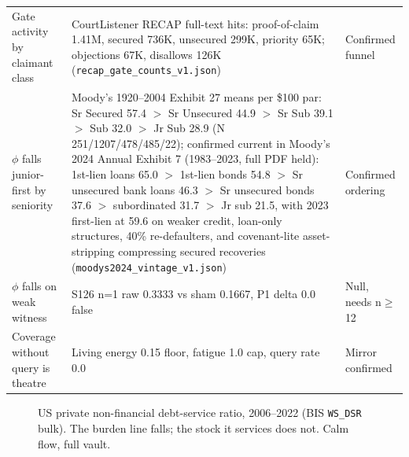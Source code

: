 \documentclass[11pt]{article}
\begin{document}
\begin{center}
\begin{tabular}{p{2.6cm}p{4.2cm}p{4.6cm}}
Gate activity by claimant class & CourtListener RECAP full-text hits: proof-of-claim 1.41M, secured 736K, unsecured 299K, priority 65K; objections 67K, disallows 126K (\texttt{recap\_gate\_counts\_v1.json}) & Confirmed funnel \\
$\phi$ falls junior-first by seniority & Moody's 1920--2004 Exhibit 27 means per \$100 par: Sr Secured 57.4 $>$ Sr Unsecured 44.9 $>$ Sr Sub 39.1 $>$ Sub 32.0 $>$ Jr Sub 28.9 (N 251/1207/478/485/22); confirmed current in Moody's 2024 Annual Exhibit 7 (1983--2023, full PDF held): 1st-lien loans 65.0 $>$ 1st-lien bonds 54.8 $>$ Sr unsecured bank loans 46.3 $>$ Sr unsecured bonds 37.6 $>$ subordinated 31.7 $>$ Jr sub 21.5, with 2023 first-lien at 59.6 on weaker credit, loan-only structures, 40\% re-defaulters, and covenant-lite asset-stripping compressing secured recoveries (\texttt{moodys2024\_vintage\_v1.json}) & Confirmed ordering \\
$\phi$ falls on weak witness & S126 n=1 raw 0.3333 vs sham 0.1667, P1 delta 0.0 false & Null, needs n$\geq$12 \\
Coverage without query is theatre & Living energy 0.15 floor, fatigue 1.0 cap, query rate 0.0 & Mirror confirmed \\
\bottomrule
\end{tabular}
\end{center}

\begin{figure}[h]
\centering
{}
\caption{US private non-financial debt-service ratio, 2006--2022 (BIS \texttt{WS\_DSR} bulk). The burden line falls; the stock it services does not. Calm flow, full vault.}
\label{fig:dsr}
\end{figure}
\end{document}
